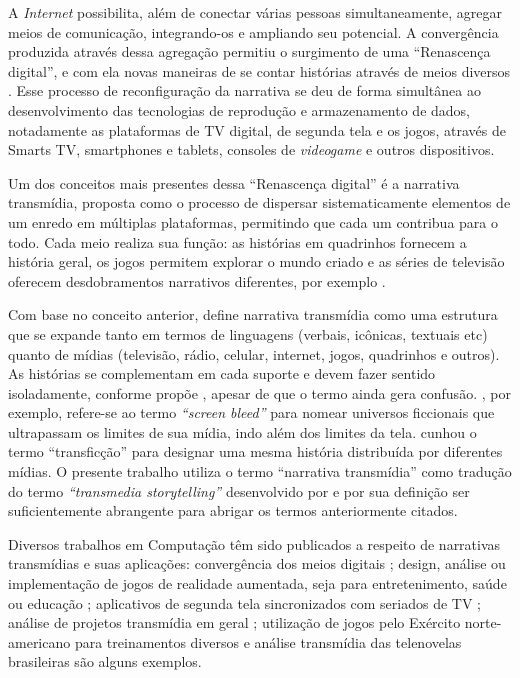 \documentclass[
article,			%
11pt,				%
oneside,			%
a4paper,			%
english,			%
brazil,				%
sumario=tradicional
]{abntex2}
\begin{document}
  A \textit{Internet} possibilita, além de conectar várias pessoas simultaneamente, agregar meios de comunicação, integrando-os e ampliando seu potencial. A convergência produzida através dessa agregação permitiu o surgimento de uma ``Renascença digital'', e com ela novas maneiras de se contar histórias através de meios diversos \cite{jenkins_2001}. Esse processo de reconfiguração da narrativa se deu de forma simultânea ao desenvolvimento das tecnologias de reprodução e armazenamento de dados, notadamente as plataformas de TV digital, de segunda tela e os jogos, através de Smarts TV, smartphones e tablets, consoles de \textit{videogame} e outros dispositivos.

  Um dos conceitos mais presentes dessa ``Renascença digital'' é a narrativa transmídia, proposta como o processo de dispersar sistematicamente elementos de um enredo em múltiplas plataformas, permitindo que cada um contribua para o todo. Cada meio realiza sua função: as histórias em quadrinhos fornecem a história geral, os jogos permitem explorar o mundo criado e as séries de televisão oferecem desdobramentos narrativos diferentes, por exemplo \cite{jenkins_fastcompany_2011}.

  Com base no conceito anterior,  define narrativa transmídia como uma estrutura que se expande tanto em termos de linguagens (verbais, icônicas, textuais etc) quanto de mídias (televisão, rádio, celular, internet, jogos, quadrinhos e outros). As histórias se complementam em cada suporte e devem fazer sentido isoladamente, conforme propõe , apesar de que o termo ainda gera confusão. , por exemplo, refere-se ao termo \textit{``screen bleed''} para nomear universos ficcionais que ultrapassam os limites de sua mídia, indo além dos limites da tela.  cunhou o termo ``transficção''  para  designar  uma  mesma  história  distribuída  por  diferentes  mídias. O presente trabalho utiliza o termo ``narrativa transmídia'' como tradução do termo \textit{``transmedia storytelling''} desenvolvido por  e por sua definição ser suficientemente abrangente para abrigar os termos anteriormente citados.

  Diversos trabalhos em Computação têm sido publicados a respeito de narrativas transmídias e suas aplicações: convergência dos meios digitais \cite{murray_2012}; design, análise ou implementação de jogos de realidade aumentada, seja para entretenimento, saúde ou educação \cite{bonsignore_2012,evans_2014,johnston_2012,holler_2014}; aplicativos de segunda tela sincronizados com seriados de TV \cite{nandakumar_2014}; análise de projetos transmídia em geral \cite{amy_2014}; utilização de jogos pelo Exército norte-americano para treinamentos diversos \cite{raybourn_2014} e análise transmídia das telenovelas brasileiras \cite{murakami_2015} são alguns exemplos.
\end{document}
